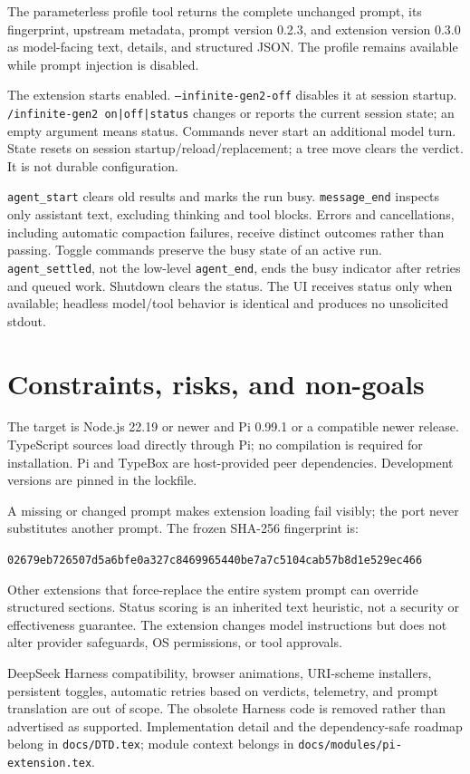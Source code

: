 \documentclass[10pt]{ltjsarticle}
\begin{document}
The parameterless profile tool returns the complete unchanged prompt, its
fingerprint, upstream metadata, prompt version 0.2.3, and extension version
0.3.0 as model-facing text, details, and structured JSON. The profile remains
available while prompt injection is disabled.

The extension starts enabled. \texttt{--infinite-gen2-off} disables it at
session startup. \texttt{/infinite-gen2 on|off|status} changes or reports the
current session state; an empty argument means status. Commands never start
an additional model turn. State resets on session startup/reload/replacement;
a tree move clears the verdict. It is not durable configuration.

\texttt{agent\_start} clears old results and marks the run busy.
\texttt{message\_end} inspects only assistant text, excluding thinking and
tool blocks. Errors and cancellations, including automatic compaction failures,
receive distinct outcomes rather than passing. Toggle commands preserve the
busy state of an active run. \texttt{agent\_settled}, not the low-level \texttt{agent\_end}, ends
the busy indicator after retries and queued work. Shutdown clears the status.
The UI receives status only when available; headless model/tool behavior is
identical and produces no unsolicited stdout.

\section{Constraints, risks, and non-goals}
The target is Node.js 22.19 or newer and Pi 0.99.1 or a compatible newer
release. TypeScript sources load directly through Pi; no compilation is
required for installation. Pi and TypeBox are host-provided peer dependencies.
Development versions are pinned in the lockfile.

A missing or changed prompt makes extension loading fail visibly; the port
never substitutes another prompt. The frozen SHA-256 fingerprint is:
\par\noindent\texttt{02679eb726507d5a6bfe0a327c8469965440be7a7c5104cab57b8d1e529ec466}
\par
Other extensions that force-replace the entire system prompt can override
structured sections. Status scoring is an inherited text heuristic, not a
security or effectiveness guarantee. The extension changes model instructions
but does not alter provider safeguards, OS permissions, or tool approvals.

DeepSeek Harness compatibility, browser animations, URI-scheme installers,
persistent toggles, automatic retries based on verdicts, telemetry, and prompt
translation are out of scope. The obsolete Harness code is removed rather
than advertised as supported. Implementation detail and the dependency-safe
roadmap belong in \texttt{docs/DTD.tex}; module context belongs in
\texttt{docs/modules/pi-extension.tex}.
\end{document}
